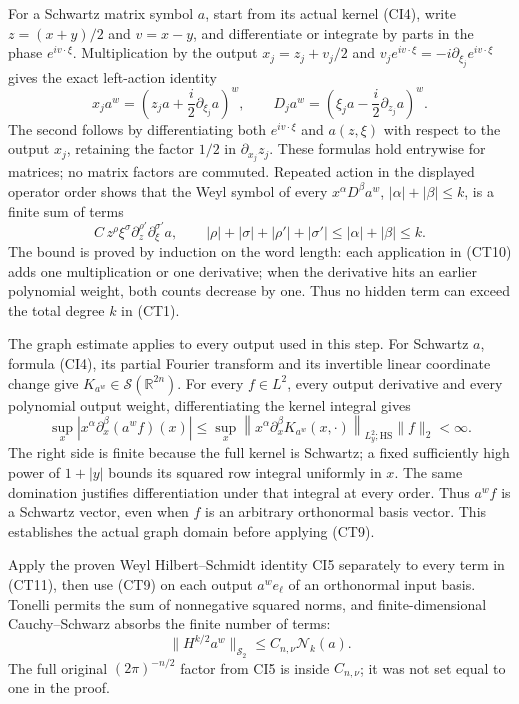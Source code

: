 \documentclass[
  11pt,
]{article}
\begin{document}
For a Schwartz matrix symbol \(a\), start from its actual kernel (CI4),
write \(z=(x+y)/2\) and \(v=x-y\), and differentiate or integrate by
parts in the phase \(e^{iv\cdot\xi}\). Multiplication by the output
\(x_j=z_j+v_j/2\) and
\(v_je^{iv\cdot\xi}=-i\partial_{\xi_j}e^{iv\cdot\xi}\) gives the exact
left-action identity \[
 x_j a^w
   =\left(z_j a+\frac{i}{2}\partial_{\xi_j}a\right)^w,
 \qquad
 D_j a^w
   =\left(\xi_j a-\frac{i}{2}\partial_{z_j}a\right)^w .
 \tag{CT10}
\] The second follows by differentiating both \(e^{iv\cdot\xi}\) and
\(a(z,\xi)\) with respect to the output \(x_j\), retaining the factor
\(1/2\) in \(\partial_{x_j}z_j\). These formulas hold entrywise for
matrices; no matrix factors are commuted. Repeated action in the
displayed operator order shows that the Weyl symbol of every
\(x^\alpha D^\beta a^w\), \(|\alpha|+|\beta|\le k\), is a finite sum of
terms \[
 C\,z^\rho\xi^\sigma
       \partial_z^{\rho'}\partial_\xi^{\sigma'}a,
 \qquad
 |\rho|+|\sigma|+|\rho'|+|\sigma'|
       \le|\alpha|+|\beta|\le k.
 \tag{CT11}
\] The bound is proved by induction on the word length: each application
in (CT10) adds one multiplication or one derivative; when the derivative
hits an earlier polynomial weight, both counts decrease by one. Thus no
hidden term can exceed the total degree \(k\) in (CT1).

The graph estimate applies to every output used in this step. For
Schwartz \(a\), formula (CI4), its partial Fourier transform and its
invertible linear coordinate change give
\(K_{a^w}\in\mathcal S(\mathbb R^{2n})\). For every \(f\in L^2\), every
output derivative and every polynomial output weight, differentiating
the kernel integral gives \[
 \sup_x\left|x^\alpha\partial_x^\beta(a^wf)(x)\right|
 \leq\sup_x\left\|x^\alpha\partial_x^\beta K_{a^w}(x,\cdot)
          \right\|_{L^2_y;\mathrm{HS}}\|f\|_2<\infty.
 \tag{CT11a}
\] The right side is finite because the full kernel is Schwartz; a fixed
sufficiently high power of \(1+|y|\) bounds its squared row integral
uniformly in \(x\). The same domination justifies differentiation under
that integral at every order. Thus \(a^wf\) is a Schwartz vector, even
when \(f\) is an arbitrary orthonormal basis vector. This establishes
the actual graph domain before applying (CT9).

Apply the proven Weyl Hilbert--Schmidt identity CI5 separately to every
term in (CT11), then use (CT9) on each output \(a^w e_\ell\) of an
orthonormal input basis. Tonelli permits the sum of nonnegative squared
norms, and finite-dimensional Cauchy--Schwarz absorbs the finite number
of terms: \[
 \|H^{k/2}a^w\|_{\mathcal S_2}
 \le C_{n,\nu}\mathcal N_k(a).
 \tag{CT12}
\] The full original \((2\pi)^{-n/2}\) factor from CI5 is inside
\(C_{n,\nu}\); it was not set equal to one in the proof.
\end{document}
